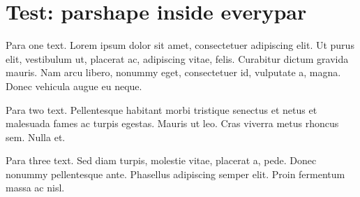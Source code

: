 \documentclass[11pt,a4paper]{article}
\begin{document}
\section{Test: parshape inside everypar}

%
%

Para one text. Lorem ipsum dolor sit amet, consectetuer adipiscing elit. Ut purus elit, vestibulum ut, placerat ac, adipiscing vitae, felis. Curabitur dictum gravida mauris. Nam arcu libero, nonummy eget, consectetuer id, vulputate a, magna. Donec vehicula augue eu neque.

Para two text. Pellentesque habitant morbi tristique senectus et netus et malesuada fames ac turpis egestas. Mauris ut leo. Cras viverra metus rhoncus sem. Nulla et.

Para three text. Sed diam turpis, molestie vitae, placerat a, pede. Donec nonummy pellentesque ante. Phasellus adipiscing semper elit. Proin fermentum massa ac nisl.

\everypar{}%
%
\end{document}

